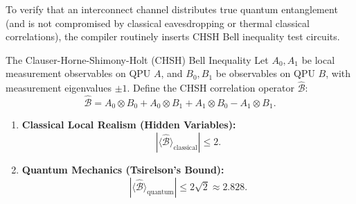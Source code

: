 To verify that an interconnect channel distributes true quantum entanglement (and is not compromised by classical eavesdropping or thermal classical correlations), the compiler routinely inserts CHSH Bell inequality test circuits.

\begin{theorembox}{The Clauser-Horne-Shimony-Holt (CHSH) Bell Inequality}
Let $A_0, A_1$ be local measurement observables on QPU $A$, and $B_0, B_1$ be observables on QPU $B$, with measurement eigenvalues $\pm 1$. Define the CHSH correlation operator $\hat{\mathcal{B}}$:
\begin{equation}
    \hat{\mathcal{B}} = A_0 \otimes B_0 + A_0 \otimes B_1 + A_1 \otimes B_0 - A_1 \otimes B_1.
    \label{eq:chsh_operator_def}
\end{equation}
\begin{enumerate}
    \item \textbf{Classical Local Realism (Hidden Variables):}
    \begin{equation}
        |\langle \hat{\mathcal{B}} \rangle_{\text{classical}}| \le 2.
    \end{equation}
    \item \textbf{Quantum Mechanics (Tsirelson's Bound):}
    \begin{equation}
        |\langle \hat{\mathcal{B}} \rangle_{\text{quantum}}| \le 2\sqrt{2} \approx 2.828.
    \end{equation}
\end{enumerate}
\end{theorembox}

